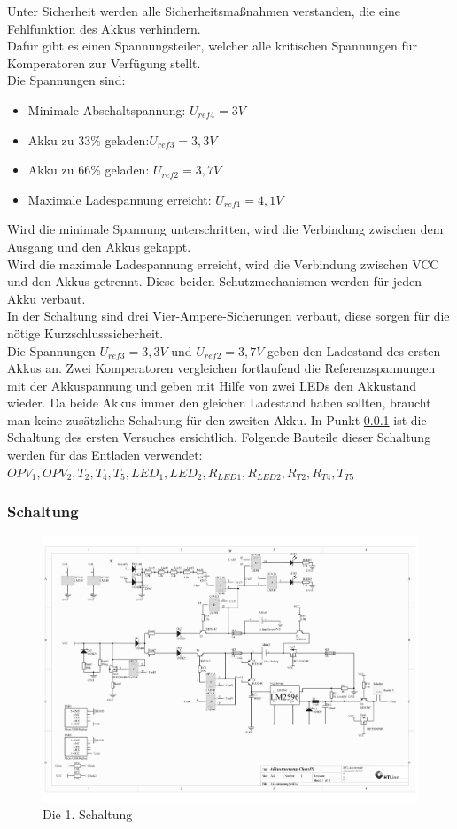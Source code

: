 \documentclass[12pt,a4paper]{article}
\begin{document}
Unter Sicherheit werden alle Sicherheitsmaßnahmen verstanden, die eine Fehlfunktion des Akkus verhindern. \\
Dafür gibt es einen Spannungsteiler, welcher alle kritischen Spannungen für Komperatoren zur Verfügung stellt. \\
Die Spannungen sind: 
\begin{itemize}
	\item{Minimale Abschaltspannung: $U_{ref4} = 3 V$}
	\item{Akku zu 33\% geladen:$ U_{ref3}=3,3V$}
	\item{Akku zu 66\% geladen: $U_{ref2} = 3,7V$}
	\item{Maximale Ladespannung erreicht: $U_{ref1} = 4,1V$}
\end{itemize}
Wird die minimale Spannung unterschritten, wird die Verbindung zwischen dem Ausgang und den Akkus gekappt. \\
Wird die maximale Ladespannung erreicht, wird die Verbindung zwischen VCC und den Akkus getrennt. Diese beiden Schutzmechanismen werden für jeden Akku verbaut.\\
In der Schaltung sind drei Vier-Ampere-Sicherungen verbaut, diese sorgen für die nötige Kurzschlusssicherheit.  \\
Die Spannungen $ U_{ref3}=3,3V$ und $U_{ref2} = 3,7V$ geben den Ladestand des ersten Akkus an. Zwei Komperatoren vergleichen fortlaufend die Referenzspannungen mit der Akkuspannung und geben mit Hilfe von zwei LEDs den Akkustand wieder. Da beide Akkus immer den gleichen Ladestand haben sollten, braucht man keine zusätzliche Schaltung für den zweiten Akku.
In Punkt \ref{SUBSUBSEC:CIRCUIT-1} ist die Schaltung des ersten Versuches ersichtlich. Folgende Bauteile dieser Schaltung werden für das Entladen verwendet:\\ $OPV_1, OPV_2,T_2,T_4, T_5,LED_1,LED_2,R_{LED1},R_{LED2},R_{T2}, R_{T4},T_{T5}$ 
\newpage
\subsubsection{Schaltung}
\label{SUBSUBSEC:CIRCUIT-1}
\begin{figure}[H]
  \centering
		\includegraphics[scale=0.7, angle=90]{graphics/20170920-Shematic.pdf}
		\caption{Die 1. Schaltung}
		\label{fig:circuit1}
\end{figure}
\end{document}
